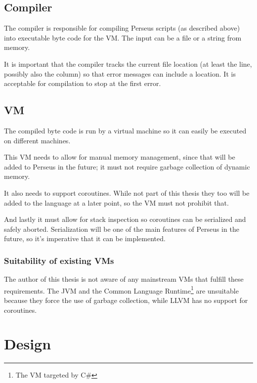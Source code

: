 	
	\section{Compiler}
		
		The compiler is responsible for compiling Perseus scripts (as described above) into executable byte code for the VM. The input can be a file or a string from memory.
		
		It is important that the compiler tracks the current file location (at least the line, possibly also the column) so that error messages can include a location. It is acceptable for compilation to stop at the first error.
	
	\section{VM}
	
		The compiled byte code is run by a virtual machine so it can easily be executed on different machines.
		
		This VM needs to allow for manual memory management, since that will be added to Perseus in the future; it must not require garbage collection of dynamic memory.
		
		It also needs to support coroutines. While not part of this thesis they too will be added to the language at a later point, so the VM must not prohibit that.
		
		And lastly it must allow for stack inspection so coroutines can be serialized and safely aborted. Serialization will be one of the main features of Perseus in the future, so it's imperative that it can be implemented.
		
		\subsection{Suitability of existing VMs}
		
			The author of this thesis is not aware of any mainstream VMs that fulfill these requirements. The JVM and the Common Language Runtime\footnote{The VM targeted by C\#} are unsuitable because they force the use of garbage collection, while LLVM has no support for coroutines.

\chapter{Design} %

